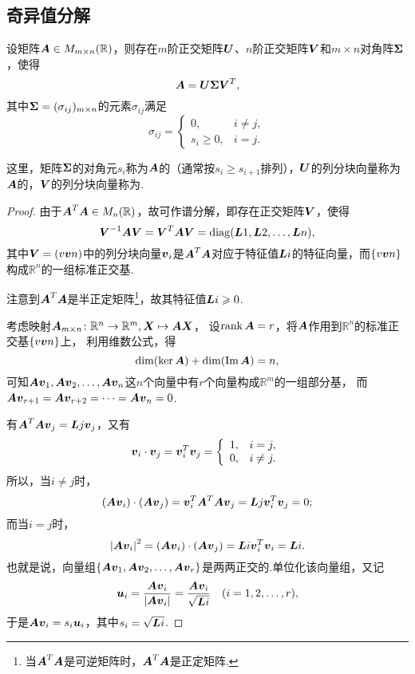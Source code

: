 \subsection{奇异值分解}
\begin{theorem}
\def\U{\mat{U}}
\def\S{\mat{\Sigma}}
\def\V{\mat{V}}
\let\Q\V
\let\P\U
\def\p{\mat{u}}
\def\q{\mat{v}}
设矩阵\(\boldsymbol{A} \in M_{m \times n}(\mathbb{R})\)，则存在\(m\)阶正交矩阵\(\U\)、\(n\)阶正交矩阵\(\V\)和\(m \times n\)对角阵\(\S\)，使得\[
\A = \U \S \V^T,
\]其中\(\S = (\sigma_{ij})_{m \times n}\)的元素\(\sigma_{ij}\)满足\[
\sigma_{ij} = \left\{ \begin{array}{cc}
0, & i \neq j, \\
s_i \geqslant 0, & i = j.
\end{array} \right.
\]

这里，矩阵\(\S\)的对角元\(s_i\)称为\(\boldsymbol{A}\)的（通常按\(s_i \geqslant s_{i+1}\)排列），\(\U\)的列分块向量称为\(\boldsymbol{A}\)的，\(\V\)的列分块向量称为.
\begin{proof}
由于\(\boldsymbol{A}^T \boldsymbol{A} \in M_n(\mathbb{R})\)，故可作谱分解，即存在正交矩阵\(\Q\)，使得\[
\Q^{-1}\A\Q = \Q^T\A\Q = \diag(\L{1},\L{2},\dotsc,\L{n}),
\]其中\(\Q=(\v{\q}{n})\)中的列分块向量\(\q_i\)是\(\boldsymbol{A}^T \boldsymbol{A}\)对应于特征值\(\boldsymbol{L}{i}\)的特征向量，而\(\{\v{\q}{n}\}\)构成\(\mathbb{R}^n\)的一组标准正交基.

注意到\(\boldsymbol{A}^T \boldsymbol{A}\)是半正定矩阵\footnote{当\(\boldsymbol{A}^T \boldsymbol{A}\)是可逆矩阵时，\(\boldsymbol{A}^T \boldsymbol{A}\)是正定矩阵.}，故其特征值\(\boldsymbol{L}{i}\geqslant0\).

考虑映射\(\boldsymbol{A}_{m \times n}\colon \mathbb{R}^n \to \mathbb{R}^m, \boldsymbol{X} \mapsto \boldsymbol{A}\boldsymbol{X}\)，%
设\(\rank\boldsymbol{A} = r\)，将\(\boldsymbol{A}\)作用到\(\mathbb{R}^n\)的标准正交基\(\{\v{\q}{n}\}\)上，%
利用维数公式，得\[
\dim(\ker \boldsymbol{A}) + \dim(\Im \boldsymbol{A}) = n,
\]
可知\(\A\q_1,\A\q_2,\dotsc,\A\q_n\)这\(n\)个向量中有\(r\)个向量构成\(\mathbb{R}^m\)的一组部分基，%
而\(\A\q_{r+1} = \A\q_{r+2} = \dotsb = \A\q_n = 0\).

有\(\A^T \A \q_j = \L{j} \q_j\)，又有\[
\q_i \cdot \q_j = \q_i^T \q_j
= \left\{ \begin{array}{lc}
1, & i=j, \\
0, & i \neq j.
\end{array} \right.
\]所以，当\(i \neq j\)时，\[
(\A\q_i)\cdot(\A\q_j) = \q_i^T \A^T \A \q_j = \L{j} \q_i^T \q_j = 0;
\]而当\(i = j\)时，\[
\abs{\A\q_i}^2 = (\A\q_i)\cdot(\A\q_j) = \L{i} \q_i^T \q_i = \L{i}.
\]也就是说，向量组\(\{\A\q_1,\A\q_2,\dotsc,\A\q_r\}\)是两两正交的.单位化该向量组，又记\[
\p_i = \frac{\A\q_i}{\abs{\A\q_i}}
= \frac{\A\q_i}{\sqrt{\L{i}}}
\quad(i=1,2,\dotsc,r),
\]于是\(\A\q_i = s_i \p_i\)，其中\(s_i = \sqrt{\boldsymbol{L}{i}}\).


\end{proof}
\end{theorem}
